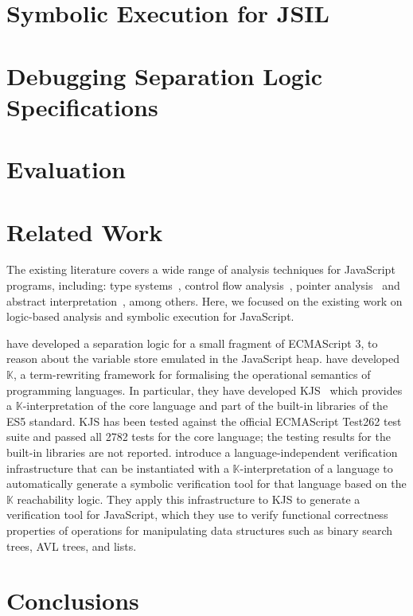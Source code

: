 \documentclass{llncs}
\newcommand{\jsil}{JSIL\xspace}
\newcommand{\myparagraph}[1]{\smallskip\noindent {\bf #1.}\hspace{1pt}}
\begin{document}
\section{Symbolic Execution for \jsil}\label{sec:jsil:symb:exec}


\section{Debugging Separation Logic Specifications}


\section{Evaluation}



\section{Related Work} 

The existing literature covers a wide range of analysis techniques for JavaScript programs, including: 
type systems~\cite{thiemann:esop:2005,anderson:ecoop:2005,jensen:sas:2009,typescript:toot:2014,feldthaus:oopsla:2014,bierman:ecoop:2014,rastogi:popl:2015},
control flow analysis~\cite{feldthaus2013efficient}, pointer analysis~\cite{jang2009points,sridharan:ecoop:12} and abstract
interpretation~\cite{kashyap:fse:14,jensen:sas:2009,andreasen:oopsla:2014,park:ecoop:15}, among others. 
Here, we focused on the existing work on logic-based analysis and symbolic execution for JavaScript. 

\myparagraph{Symbolic Execution} 




\myparagraph{Logic-based Analysis} 
%
\cite{gardner:popl:2012} have developed a separation logic for a small fragment of ECMAScript 3, to reason about the variable store emulated in the JavaScript heap.
%
\cite{rosu-serbanuta-2010-jlap} have developed $\mathbb{K}$, a term-rewriting framework  for  formalising the operational
semantics of programming languages.
 In particular, they have developed KJS~\cite{Park:2015} which provides a $\mathbb{K}$-interpretation of the core language and part of the built-in libraries of the ES5 standard. KJS has been tested against the official ECMAScript Test262 test suite and passed all 2782 tests for the core language; the testing results for the built-in libraries are not reported. 
\cite{stefanescu-park-yuwen-li-rosu-2016-oopsla} introduce a language-independent verification infrastructure 
that can be instantiated with a $\mathbb{K}$-interpretation of a  language to automatically generate a symbolic verification tool for that language based on the $\mathbb{K}$ reachability logic. They apply this infrastructure to KJS to generate a verification tool for JavaScript, which they use to verify functional correctness properties of operations for manipulating data structures such as binary search trees, AVL trees, and lists.


\section{Conclusions}\label{conclusions}

\newpage



\newpage
\appendix




 
\end{document}
